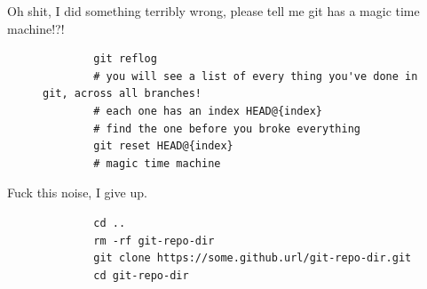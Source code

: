 \begin{frame}[fragile]{Oh shit, I did something terribly wrong, please tell me git has a magic time machine!?!}
    \begin{figure}
    \begin{lstlisting}
        git reflog
        # you will see a list of every thing you've done in git, across all branches!
        # each one has an index HEAD@{index}
        # find the one before you broke everything
        git reset HEAD@{index}
        # magic time machine
    \end{lstlisting}
    \end{figure}
\end{frame}

\begin{frame}[fragile]{Fuck this noise, I give up.}

    \begin{figure}
        \begin{lstlisting}
        cd ..
        rm -rf git-repo-dir
        git clone https://some.github.url/git-repo-dir.git
        cd git-repo-dir
        \end{lstlisting}
    \end{figure}
\end{frame}

